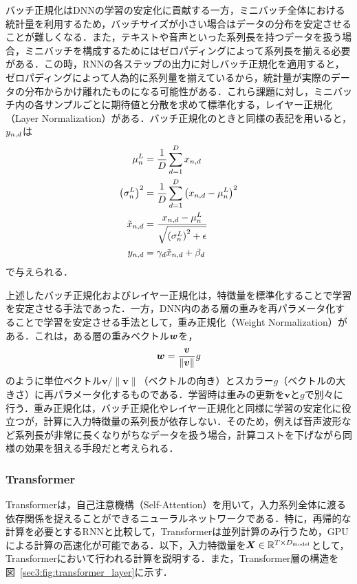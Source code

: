 \documentclass[12pt]{jarticle}
\numberwithin{equation}{section}    %
\numberwithin{figure}{section}      %
\numberwithin{table}{section}      %
\begin{document}
バッチ正規化はDNNの学習の安定化に貢献する一方，ミニバッチ全体における統計量を利用するため，バッチサイズが小さい場合はデータの分布を安定させることが難しくなる．また，テキストや音声といった系列長を持つデータを扱う場合，ミニバッチを構成するためにはゼロパディングによって系列長を揃える必要がある．この時，RNNの各ステップの出力に対しバッチ正規化を適用すると，ゼロパディングによって人為的に系列量を揃えているから，統計量が実際のデータの分布からかけ離れたものになる可能性がある．これら課題に対し，ミニバッチ内の各サンプルごとに期待値と分散を求めて標準化する，レイヤー正規化（Layer Normalization）\cite{ba2016layer}がある．バッチ正規化のときと同様の表記を用いると，$y_{n, d}$は
\begin{align}
    \mu^{L}_{n}                        & = \frac{1}{D} \sum_{d = 1}^{D} x_{n, d}                                        \\
    \left(\sigma^{L}_{n}\right)^{2}    & = \frac{1}{D} \sum_{d = 1}^{D} \left(x_{n, d} - \mu^{L}_{n}\right)^{2} \\
    \tilde{x}_{n, d} & = \frac{x_{n, d} - \mu^{L}_{n}}{\sqrt{\left(\sigma^{L}_{n}\right)^{2} + \epsilon}}     \\
    y_{n, d}        & = \gamma_{d} \tilde{x}_{n, d} +  \beta_{d}
\end{align}
で与えられる．

上述したバッチ正規化およびレイヤー正規化は，特徴量を標準化することで学習を安定させる手法であった．一方，DNN内のある層の重みを再パラメータ化することで学習を安定させる手法として，重み正規化（Weight Normalization）\cite{salimans2016weight}がある．これは，ある層の重みベクトル$\bm{w}$を，
\begin{equation}
    \bm{w} = \frac{\bm{v}}{\| \bm{v} \|} g
\end{equation}
のように単位ベクトル$\bm{v} / \| \bm{v} \|$（ベクトルの向き）とスカラー$g$（ベクトルの大きさ）に再パラメータ化するものである．学習時は重みの更新を$\bm{v}$と$g$で別々に行う．重み正規化は，バッチ正規化やレイヤー正規化と同様に学習の安定化に役立つが，計算に入力特徴量の系列長が依存しない．そのため，例えば音声波形など系列長が非常に長くなりがちなデータを扱う場合，計算コストを下げながら同様の効果を狙える手段だと考えられる．

\subsubsection{Transformer}
Transformer\cite{vaswani2017attention}は，自己注意機構（Self-Attention）を用いて，入力系列全体に渡る依存関係を捉えることができるニューラルネットワークである．特に，再帰的な計算を必要とするRNNと比較して，Transformerは並列計算のみ行うため，GPUによる計算の高速化が可能である．以下，入力特徴量を$\bm{X} \in \mathbb{R}^{T \times D_{\text{model}}}$として，Transformerにおいて行われる計算を説明する．また，Transformer層の構造を図~\ref{sec3:fig:transformer_layer}に示す．
\end{document}
